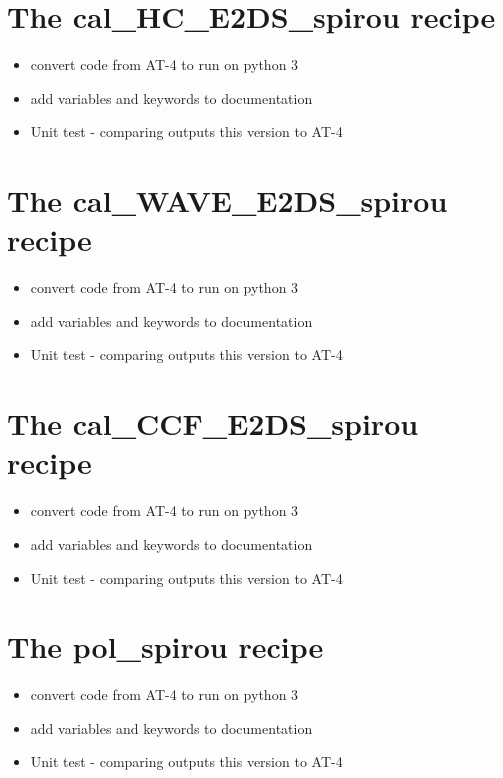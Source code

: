 \section{The cal\_HC\_E2DS\_spirou recipe}
\label{ch:todo:cal_HC_E2DS_spirou}

\begin{itemize}
	\item convert code from AT-4 to run on python 3
	\item add variables and keywords to documentation
	\item Unit test - comparing outputs this version to AT-4
\end{itemize}


\section{The cal\_WAVE\_E2DS\_spirou recipe}
\label{ch:todo:cal_WAVE_E2DS_spirou}

\begin{itemize}
	\item convert code from AT-4 to run on python 3
	\item add variables and keywords to documentation
	\item Unit test - comparing outputs this version to AT-4
\end{itemize}


\section{The cal\_CCF\_E2DS\_spirou recipe}
\label{ch:todo:cal_CCF_E2DS_spirou}

\begin{itemize}
	\item convert code from AT-4 to run on python 3
	\item add variables and keywords to documentation
	\item Unit test - comparing outputs this version to AT-4
\end{itemize}


\section{The pol\_spirou recipe}
\label{ch:todo:pol_spirou}

\begin{itemize}
	\item convert code from AT-4 to run on python 3
	\item add variables and keywords to documentation
	\item Unit test - comparing outputs this version to AT-4
\end{itemize}
